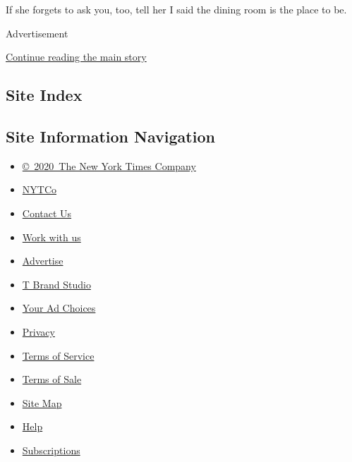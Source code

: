 If she forgets to ask you, too, tell her I said the dining room is the
place to be.

Advertisement

\protect\hyperlink{after-bottom}{Continue reading the main story}

\hypertarget{site-index}{%
\subsection{Site Index}\label{site-index}}

\hypertarget{site-information-navigation}{%
\subsection{Site Information
Navigation}\label{site-information-navigation}}

\begin{itemize}
\tightlist
\item
  \href{https://help.nytimes3xbfgragh.onion/hc/en-us/articles/115014792127-Copyright-notice}{©~2020~The
  New York Times Company}
\end{itemize}

\begin{itemize}
\tightlist
\item
  \href{https://www.nytco.com/}{NYTCo}
\item
  \href{https://help.nytimes3xbfgragh.onion/hc/en-us/articles/115015385887-Contact-Us}{Contact
  Us}
\item
  \href{https://www.nytco.com/careers/}{Work with us}
\item
  \href{https://nytmediakit.com/}{Advertise}
\item
  \href{http://www.tbrandstudio.com/}{T Brand Studio}
\item
  \href{https://www.nytimes3xbfgragh.onion/privacy/cookie-policy\#how-do-i-manage-trackers}{Your
  Ad Choices}
\item
  \href{https://www.nytimes3xbfgragh.onion/privacy}{Privacy}
\item
  \href{https://help.nytimes3xbfgragh.onion/hc/en-us/articles/115014893428-Terms-of-service}{Terms
  of Service}
\item
  \href{https://help.nytimes3xbfgragh.onion/hc/en-us/articles/115014893968-Terms-of-sale}{Terms
  of Sale}
\item
  \href{https://spiderbites.nytimes3xbfgragh.onion}{Site Map}
\item
  \href{https://help.nytimes3xbfgragh.onion/hc/en-us}{Help}
\item
  \href{https://www.nytimes3xbfgragh.onion/subscription?campaignId=37WXW}{Subscriptions}
\end{itemize}
